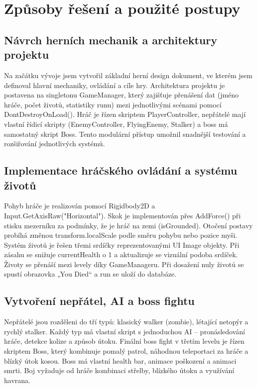 \documentclass[12pt,a4paper]{article}
\begin{document}
	
	\newpage
	
	\section{Způsoby řešení a použité postupy}
	
	\subsection{Návrch herních mechanik a architektury projektu}
	
	Na začátku vývoje jsem vytvořil základní herní design dokument, ve kterém jsem definoval hlavní mechaniky, ovládání a cíle hry. Architektura projektu je postavena na singletonu GameManager, který zajišťuje přenášení dat (jméno hráče, počet životů, statistiky runu) mezi jednotlivými scénami pomocí DontDestroyOnLoad().
	Hráč je řízen skriptem PlayerController, nepřátelé mají vlastní řídicí skripty (EnemyController, FlyingEnemy, Stalker) a boss má samostatný skript Boss. Tento modulární přístup umožnil snadnější testování a rozšiřování jednotlivých systémů.
	
    \subsection{Implementace hráčského ovládání a systému životů}
    
    Pohyb hráče je realizován pomocí Rigidbody2D a Input.GetAxisRaw("Horizontal"). Skok je implementován přes AddForce() při stisku mezerníku za podmínky, že je hráč na zemi (isGrounded). Otočení postavy probíhá změnou transform.localScale podle směru pohybu nebo pozice myši.
    Systém životů je řešen třemi srdíčky reprezentovanými UI Image objekty. Při zásahu se snižuje currentHealth o 1 a aktualizuje se vizuální podoba srdíček. Životy se přenáší mezi levely díky GameManageru. Při dosažení nuly životů se spustí obrazovka „You Died“ a run se uloží do databáze.
    
    \subsection{Vytvoření nepřátel, AI a boss fightu}
    
    Nepřátelé jsou rozděleni do tří typů: klasický walker (zombie), létající netopýr a rychlý stalker. Každý typ má vlastní skript s jednoduchou AI – pronásledování hráče, detekce kolize a způsob útoku.
    Finální boss fight v třetím levelu je řízen skriptem Boss, který kombinuje pomalý patrol, náhodnou teleportaci za hráče a blízký útok kosou. Boss má vlastní health bar, animace poškození a animaci smrti. Boj vyžaduje od hráče kombinaci střelby, blízkého útoku a využívání havrana.
    
\end{document}
